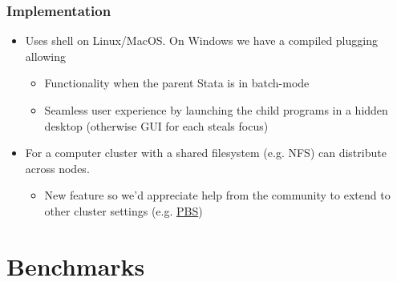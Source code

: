 \documentclass[9pt,\ExtraDocOpts]{beamer}
\begin{document}
\begin{frame}
\frametitle{Implementation }
\begin{itemize}
\item Uses shell on Linux/MacOS. On Windows we have a compiled plugging allowing\pause{}
\begin{itemize}
\item Functionality when the parent Stata is in batch-mode\pause{}
\item Seamless user experience by launching the child programs in a hidden desktop (otherwise GUI for each steals focus)\pause{}
\end{itemize}
\item For a computer cluster with a shared filesystem (e.g. NFS) can distribute across nodes. \pause{}
\begin{itemize}
\item New feature so we'd appreciate help from the community to extend to other cluster settings (e.g. \href{https://en.wikipedia.org/wiki/Portable_Batch_System}{PBS})\pause{}
\end{itemize}

\end{itemize}
\end{frame}


%


%

\section{Benchmarks}
\frame{\tableofcontents[currentsection]}
\end{document}
